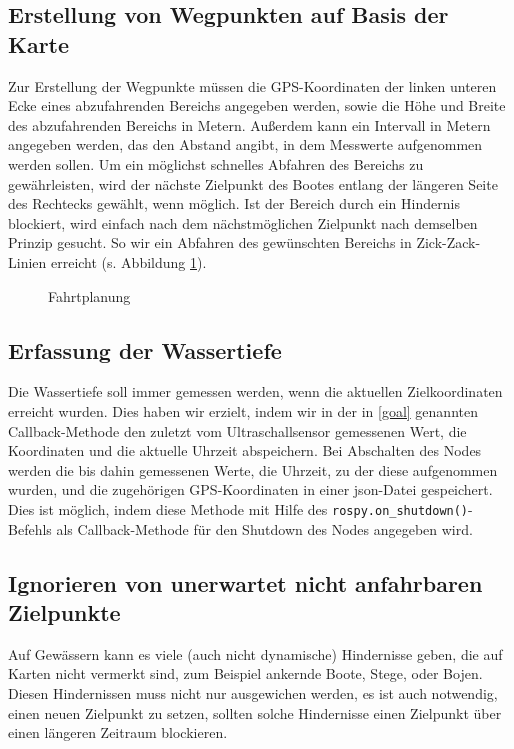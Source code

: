 \documentclass[11pt]{article}
\begin{document}
\subsection{Erstellung von Wegpunkten auf Basis der Karte}
Zur Erstellung der Wegpunkte müssen die GPS-Koordinaten der linken unteren Ecke eines abzufahrenden Bereichs angegeben werden, sowie die Höhe und Breite des abzufahrenden Bereichs in Metern. Außerdem kann ein Intervall in Metern angegeben werden, das den Abstand angibt, in dem Messwerte aufgenommen werden sollen. Um ein möglichst schnelles Abfahren des Bereichs zu gewährleisten, wird der nächste Zielpunkt des Bootes entlang der längeren Seite des Rechtecks gewählt, wenn möglich. Ist der Bereich durch ein Hindernis blockiert, wird einfach nach dem nächstmöglichen Zielpunkt nach demselben Prinzip gesucht. So wir ein Abfahren des gewünschten Bereichs in Zick-Zack-Linien erreicht (s. Abbildung \ref{Fahrtplanung}).

\begin{figure}[h]
	\centering
	\resizebox{0.8\textwidth}{!}{}
	\caption{Fahrtplanung}
	\label{Fahrtplanung}
\end{figure}

\subsection{Erfassung der Wassertiefe} \label{measurements}
Die Wassertiefe soll immer gemessen werden, wenn die aktuellen Zielkoordinaten erreicht wurden. Dies haben wir erzielt, indem wir in der in \ref{goal} genannten Callback-Methode den zuletzt vom Ultraschallsensor gemessenen Wert, die Koordinaten und die aktuelle Uhrzeit abspeichern. Bei Abschalten des Nodes werden die bis dahin gemessenen Werte, die Uhrzeit, zu der diese aufgenommen wurden, und die zugehörigen GPS-Koordinaten in einer json-Datei gespeichert. Dies ist möglich, indem diese Methode mit Hilfe des \texttt{rospy.on\_shutdown()}-Befehls als Callback-Methode für den Shutdown des Nodes angegeben wird.

\subsection{Ignorieren von unerwartet nicht anfahrbaren Zielpunkte}
Auf Gewässern kann es viele (auch nicht dynamische) Hindernisse geben, die auf Karten nicht vermerkt sind, zum Beispiel ankernde Boote, Stege, oder Bojen. Diesen Hindernissen muss nicht nur ausgewichen werden, es ist auch notwendig, einen neuen Zielpunkt zu setzen, sollten solche Hindernisse einen Zielpunkt über einen längeren Zeitraum blockieren. 
\end{document}
